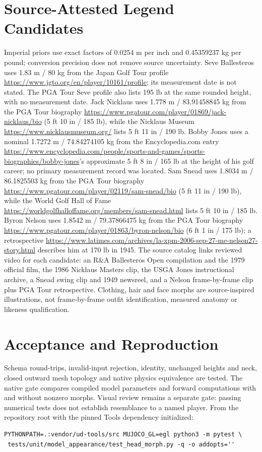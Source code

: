 \documentclass{article}
\begin{document}
\section{Source-Attested Legend Candidates}
Imperial priors use exact factors of 0.0254 m per inch and 0.45359237 kg per
pound; conversion precision does not remove source uncertainty. Seve
Ballesteros uses 1.83 m / 80 kg from the Japan Golf Tour profile
\url{https://www.jgto.org/en/player/10161/profile}; its measurement date is
not stated. The PGA Tour Seve profile also lists 195 lb at the same rounded
height, with no measurement date. Jack Nicklaus uses 1.778 m / 83.91458845 kg from the PGA Tour
biography \url{https://www.pgatour.com/player/01869/jack-nicklaus/bio}
(5 ft 10 in / 185 lb), while the Nicklaus Museum
\url{https://www.nicklausmuseum.org/} lists 5 ft 11 in / 190 lb.
Bobby Jones uses a nominal 1.7272 m / 74.84274105 kg from the Encyclopedia.com
entry \url{https://www.encyclopedia.com/people/sports-and-games/sports-biographies/bobby-jones}'s
approximate 5 ft 8 in / 165 lb at the height of his golf career; no primary
measurement record was located. Sam Snead uses 1.8034 m / 86.1825503 kg
from the PGA Tour biography \url{https://www.pgatour.com/player/02119/sam-snead/bio}
(5 ft 11 in / 190 lb), while the World Golf Hall of Fame
\url{https://worldgolfhalloffame.org/members/sam-snead.html} lists 5 ft 10 in
/ 185 lb. Byron Nelson uses 1.8542 m / 79.37866475 kg from the PGA Tour
biography \url{https://www.pgatour.com/player/01863/byron-nelson/bio}
(6 ft 1 in / 175 lb); a retrospective
\url{https://www.latimes.com/archives/la-xpm-2006-sep-27-me-nelson27-story.html}
describes him at 170 lb in 1945.
The source catalog links reviewed video for each candidate: an R\&A Ballesteros
Open compilation and the 1979 official film, the 1986 Nicklaus Masters clip,
the USGA Jones instructional archive, a Snead swing clip and 1949 newsreel,
and a Nelson frame-by-frame clip plus PGA Tour retrospective. Clothing,
hair and face morphs are source-inspired illustrations, not frame-by-frame
outfit identification, measured anatomy or likeness qualification.
\section{Acceptance and Reproduction}
Schema round-trips, invalid-input rejection, identity, unchanged heights and
neck, closed outward mesh topology and native physics equivalence are tested.
The native gate compares compiled model parameters and forward computations
with and without nonzero morphs. Visual review remains a separate gate:
passing numerical tests does not establish resemblance to a named player.
From the repository root with the pinned Tools dependency initialized:
\begin{verbatim}
PYTHONPATH=.:vendor/ud-tools/src MUJOCO_GL=egl python3 -m pytest \
 tests/unit/model_appearance/test_head_morph.py -q -o addopts=''
\end{verbatim}
\end{document}
